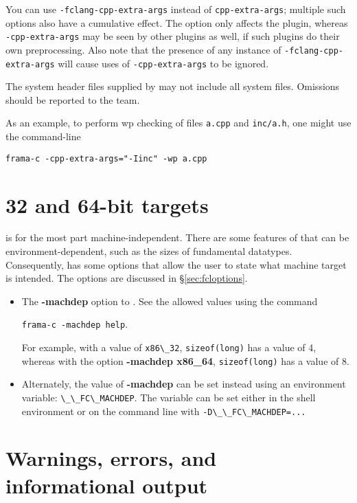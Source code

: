 You can use \lstinline|-fclang-cpp-extra-args| instead of \lstinline|cpp-extra-args|; multiple such options also have a cumulative effect. 
The \fcl option only affects the \fcl plugin, whereas 
\lstinline|-cpp-extra-args| may be seen by other plugins as well, if such plugins do their own preprocessing. Also note that the presence of any instance of \lstinline|-fclang-cpp-extra-args| will cause uses of \lstinline|-cpp-extra-args| to be ignored. 

The system header files supplied by \fcl may not include all \cpp system files. Omissions should be reported to the \fc team.

As an example, to perform wp checking of files \lstinline|a.cpp| and \lstinline|inc/a.h|, one might use the command-line \\
\centerline{\lstinline|frama-c -cpp-extra-args="-Iinc" -wp a.cpp|}

\section{32 and 64-bit targets}
\label{sec:bit}

\acslpp is for the most part machine-independent. There are some features of \cpp that can be environment-dependent, such as the sizes of fundamental datatypes. Consequently, \framac has some options that allow the user to state what machine target is intended. The \fcl options are discussed in \S\ref{sec:fcloptions}.

\begin{itemize}
\item The \textbf{-machdep} option to \framac. See the allowed values using the command\\
\centerline{ \lstinline|frama-c -machdep help|.}
 For example, with a value of \lstinline|x86\_32|, \lstinline|sizeof(long)| has a value of 4, whereas with the option \textbf{-machdep x86\_64}, \lstinline|sizeof(long)| has a value of 8.
\item Alternately, the value of \textbf{-machdep} can be set instead using an environment variable: \lstinline|\_\_FC\_MACHDEP|. The variable can be set either in the shell environment or on the command line with \lstinline|-D\_\_FC\_MACHDEP=...|

\end{itemize}


\section{Warnings, errors, and informational output}

